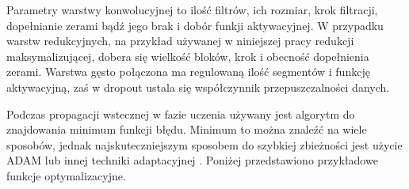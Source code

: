 {\parindent0pt %
Parametry warstwy konwolucyjnej to ilość filtrów, ich rozmiar, krok filtracji, dopełnianie zerami bądź jego brak i dobór funkji aktywacyjnej. W przypadku warstw redukcyjnych, na przykład używanej w niniejszej pracy redukcji maksymalizującej, dobera się wielkość bloków, krok i obecność dopełnienia zerami. Warstwa gęsto połączona ma regulowaną ilość segmentów i funkcję aktywacyjną, zaś w dropout ustala się współczynnik przepuszczalności danych.

Podczas propagacji wstecznej w fazie uczenia używany jest algorytm do znajdowania minimum funkcji błędu. Minimum to można znaleźć na wiele sposobów, jednak najskuteczniejszym sposobem do szybkiej zbieżności jest użycie ADAM lub innej techniki adaptacyjnej \cite{gradient_decent}. Poniżej przedstawiono przykładowe funkcje optymalizacyjne.

}
